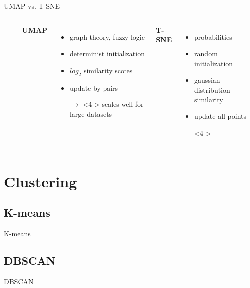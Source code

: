 \documentclass{irdbeamer}
\begin{document}
\begin{frame}{UMAP vs. T-SNE}
\begin{columns}
\begin{column}{0.05\textwidth}
\begin{itemize}
    \item[] 
    \item[] 
    \item[] 
    \item[] 
    \item[] 
\end{itemize}
\end{column}
        \textbf{UMAP}
        \begin{itemize}
            \item<1-> graph theory, fuzzy logic
            \item<2-> determinist initialization
            \item<3-> $log_2$ similarity scores
            \item<4-> update by pairs 
            \item[$\rightarrow$]<4-> scales well for large datasets
        \end{itemize}
        \textbf{T-SNE}
        \begin{itemize}
            \item<1-> probabilities
            \item<2-> random initialization
            \item<3-> gaussian distribution similarity
            \item<4-> update all points
            \item[]<4->
        \end{itemize}
\end{columns}

    
\end{frame}

\section{Clustering}

\subsection{K-means}
\begin{frame}{K-means}
    
\end{frame}

\subsection{DBSCAN}
\begin{frame}{DBSCAN}
    
\end{frame}
\end{document}
